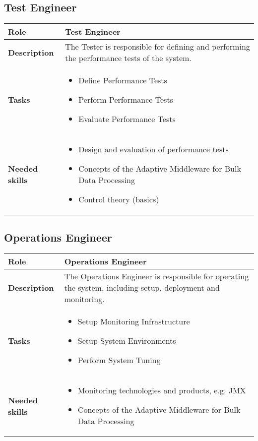 \subsection{Test Engineer}
\begin{minipage}{\textwidth}
 \label{table:ch6_Role_Tester}
\begin{tabular}
	{|m{2cm}|m{10cm}|} \hline \bfseries Role & Test Engineer\\
	\hline \bfseries Description & The Tester is responsible for defining and performing the performance tests of the system.\\
	\hline \bfseries Tasks & 
	\begin{itemize}
		\item Define Performance Tests
		\item Perform Performance Tests
		\item Evaluate Performance Tests
	\end{itemize}
	\\
	\hline
	\bfseries Needed skills &
	\begin{itemize}
		\item Design and evaluation of performance tests
		\item Concepts of the Adaptive Middleware for Bulk Data Processing
		\item Control theory (basics)
	\end{itemize}
	\\
	\hline
\end{tabular}
\end{minipage}

\subsection{Operations Engineer}
\begin{minipage}{\textwidth}
 \label{table:ch6_Role_Operations_Engineer}
\begin{tabular}
	{|m{2cm}|m{10cm}|} \hline \bfseries Role & Operations Engineer\\
	\hline \bfseries Description & The Operations Engineer is responsible for operating the system, including setup, deployment and monitoring.\\
	\hline \bfseries Tasks & 
	\begin{itemize}
		\item Setup Monitoring Infrastructure
		\item Setup System Environments
		\item Perform System Tuning
	\end{itemize}
	\\
	\hline
	\bfseries Needed skills &
	\begin{itemize}
		\item Monitoring technologies and products, e.g. \ac{JMX}
		\item Concepts of the Adaptive Middleware for Bulk Data Processing
	\end{itemize}
	\\
	\hline
\end{tabular}
\end{minipage}

